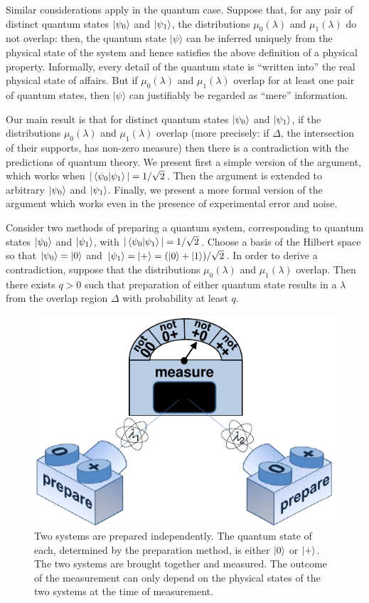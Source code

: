 \documentclass[amsmath,amssymb,superscriptaddress,twocolumn,pra]{revtex4-1}
\begin{document}
Similar considerations apply in the quantum case. Suppose that, for any pair of distinct quantum states $\ket{\psi_0}$ and $\ket{\psi_1}$, the distributions $\mu_0(\lambda)$ and $\mu_1(\lambda)$ do not overlap: then, the quantum state $|\psi\rangle$ can be inferred uniquely from the physical state of the system and hence satisfies the above definition of a physical property. Informally, every detail of the quantum state is ``written into'' the real physical state of affairs. But if $\mu_0(\lambda)$ and $\mu_1(\lambda)$ overlap for at least one pair of quantum states, then $|\psi\rangle$ can justifiably be regarded as ``mere'' information.

Our main result is that for distinct quantum states $\ket{\psi_0}$ and $\ket{\psi_1}$, if the distributions $\mu_0(\lambda)$ and $\mu_1(\lambda)$ overlap (more precisely: if $\Delta$, the intersection of their supports, has non-zero measure) then there is a contradiction with the predictions of quantum theory. We present first a simple version of the argument, which works when $|\braket{\psi_0|\psi_1}| = 1/\sqrt{2}$. Then the argument is extended to arbitrary $\ket{\psi_0}$ and $\ket{\psi_1}$. Finally, we present a more formal version of the argument which works even in the presence of experimental error and noise.

Consider two methods of preparing a quantum system, corresponding to quantum states $\ket{\psi_0}$ and $\ket{\psi_1}$, with $|\braket{\psi_0|\psi_1}| = 1/\sqrt{2}$. Choose a basis of the Hilbert space so that $\ket{\psi_0} = \ket{0}$ and $\ket{\psi_1} = \ket{+} = (\ket{0} + \ket{1})/\sqrt 2$. In order to derive a contradiction, suppose that the distributions $\mu_0(\lambda)$ and $\mu_1(\lambda)$ overlap. Then there exists $q>0$ such that preparation of either quantum state results in a $\lambda$ from the overlap region $\Delta$ with probability at least $q$.

\begin{figure}
  \includegraphics[width=\columnwidth]{figs/nogofig2}
  \caption{Two systems are prepared independently. The quantum state of each, determined by the preparation method, is either $\ket{0}$ or $\ket{+}$. The two systems are brought together and measured. The outcome of the measurement can only depend on the physical states of the two systems at the time of measurement.}
  \label{fig2}
\end{figure}
\end{document}
